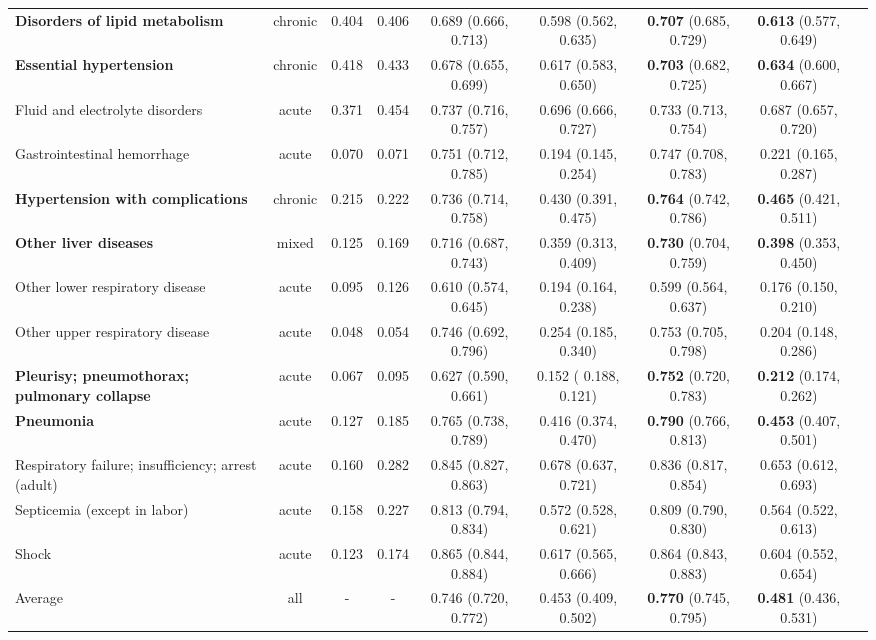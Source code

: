 \documentclass[pmlr]{jmlr}
\begin{document}
\begin{table*}[t!]
{\begin{tabular}{l c c c| c  c| c c c}
    \textbf{Disorders of lipid metabolism} & chronic & 0.404 &0.406 & 0.689 (0.666, 0.713) & 0.598 (0.562, 0.635)& \textbf{0.707} (0.685, 0.729) & \textbf{0.613} (0.577, 0.649) \\ 
    \textbf{Essential hypertension} & chronic & 0.418 &0.433 & 0.678 (0.655, 0.699) & 0.617 (0.583, 0.650) & \textbf{0.703} (0.682, 0.725) & \textbf{0.634} (0.600, 0.667) \\ 
    Fluid and electrolyte disorders & acute & 0.371 &0.454 & 0.737 (0.716, 0.757) & 0.696 (0.666, 0.727) & 0.733 (0.713, 0.754) & 0.687 (0.657, 0.720) \\ 
    Gastrointestinal hemorrhage & acute & 0.070 &0.071 &0.751 (0.712, 0.785) & 0.194 (0.145, 0.254)& 0.747 (0.708, 0.783) & 0.221 (0.165, 0.287) \\ 
    \textbf{Hypertension with complications} & chronic & 0.215 & 0.222 & 0.736 (0.714, 0.758) & 0.430 (0.391, 0.475)  & \textbf{0.764} (0.742, 0.786) & \textbf{0.465} (0.421, 0.511)\\ \textbf{Other liver diseases} & mixed &0.125 &0.169 & 0.716 (0.687, 0.743) & 0.359 (0.313, 0.409)   & \textbf{0.730} (0.704, 0.759) & \textbf{0.398} (0.353, 0.450)\\ 
    Other lower respiratory disease & acute & 0.095 &0.126 & 0.610 (0.574, 0.645) & 0.194 (0.164, 0.238)  &  0.599 (0.564, 0.637) & 0.176 (0.150, 0.210) \\ 
    Other upper respiratory disease & acute & 0.048 &0.054 & 0.746 (0.692, 0.796) & 0.254 (0.185, 0.340)  & 0.753 (0.705, 0.798) & 0.204 (0.148, 0.286)    \\ 
    \textbf{Pleurisy; pneumothorax; pulmonary collapse} & acute & 0.067 &0.095 & 0.627 (0.590, 0.661) & 0.152 ( 0.188, 0.121) & \textbf{0.752} (0.720, 0.783) & \textbf{0.212} (0.174, 0.262) \\ 
    \textbf{Pneumonia} & acute & 0.127 & 0.185 &0.765 (0.738, 0.789) & 0.416 (0.374, 0.470) & \textbf{0.790} (0.766, 0.813) & \textbf{0.453} (0.407, 0.501)\\ 
    Respiratory failure; insufficiency; arrest (adult) & acute & 0.160& 0.282 & 0.845 (0.827, 0.863) & 0.678 (0.637, 0.721) & 0.836 (0.817, 0.854) & 0.653 (0.612, 0.693) \\ 
    Septicemia (except in labor) & acute & 0.158 &0.227 & 0.813 (0.794, 0.834) & 0.572 (0.528, 0.621)&0.809 (0.790, 0.830) & 0.564 (0.522, 0.613)\\ 
    Shock & acute & 0.123 &0.174 & 0.865 (0.844, 0.884) & 0.617 (0.565, 0.666)  & 0.864 (0.843, 0.883) & 0.604 (0.552, 0.654) \\

  \midrule
Average & all & - & - & 0.746 (0.720, 0.772)& 0.453 (0.409, 0.502)  & \textbf{0.770} (0.745, 0.795)  & \textbf{0.481} (0.436, 0.531) \\
  \bottomrule 
    \end{tabular}}
    \label{tab:phenotype_wise}
\end{table*}
\end{document}

